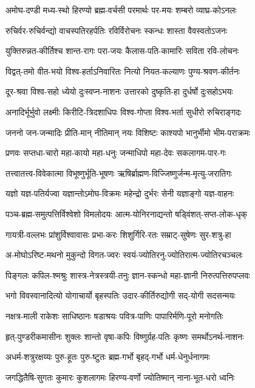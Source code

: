 \twolineshloka
{अमोघ-दण्डी मध्य-स्थो हिरण्यो ब्रह्म-वर्चसी}
{परमार्थः पर-मयः शम्बरो व्याघ्र-कोऽनलः}

\twolineshloka
{रुचिर्वर-रुचिर्वन्द्यो वाचस्पतिरहर्पतिः}
{रविर्विरोचनः स्कन्धः शास्ता वैवस्वतोऽजनः}

\twolineshloka
{युक्तिरुन्नत-कीर्तिश्च शान्त-रागः परा-जयः}
{कैलास-पति-कामारिः सविता रवि-लोचनः}

\twolineshloka
{विद्वत्-तमो वीत-भयो विश्व-हर्ताऽनिवारितः}
{नित्यो नियत-कल्याणः पुण्य-श्रवण-कीर्तनः}

\twolineshloka
{दूर-श्रवा विश्व-सहो ध्येयो दुःस्वप्न-नाशनः}
{उत्तारको दुष्कृति-हा दुर्धर्षो दुःसहोऽभयः}

\twolineshloka
{अनादिर्भूर्भुवो लक्ष्मीः किरीटि-त्रिदशाधिपः}
{विश्व-गोप्ता विश्व-भर्ता सुधीरो रुचिराङ्गदः}

\twolineshloka
{जननो जन-जन्मादिः प्रीति-मान् नीतिमान् नयः}
{विशिष्टः काश्यपो भानुर्भीमो भीम-पराक्रमः}

\twolineshloka
{प्रणवः सप्तधा-चारो महा-कायो महा-धनुः}
{जन्माधिपो महा-देवः सकलागम-पार-गः}

\twolineshloka
{तत्त्वातत्त्व-विवेकात्मा विभूष्णुर्भूति-भूषणः}
{ऋषिर्ब्राह्मण-विज्जिष्णुर्जन्म-मृत्यु-जरातिगः}

\twolineshloka
{यज्ञो यज्ञ-पतिर्यज्वा यज्ञान्तोऽमोघ-विक्रमः}
{महेन्द्रो दुर्भरः सेनी यज्ञाङ्गो यज्ञ-वाहनः}

\twolineshloka
{पञ्च-ब्रह्म-समुत्पत्तिर्विश्वेशो विमलोदयः}
{आत्म-योनिरनाद्यन्तो षड्विंशत्-सप्त-लोक-धृक्}

\twolineshloka
{गायत्री-वल्लभः प्रांशुर्विश्वावासः प्रभा-करः}
{शिशुर्गिरि-रतः सम्राट्-सुषेणः सुर-शत्रु-हा}

\twolineshloka
{अ-मोघोऽरिष्ट-मथनो मुकुन्दो विगत-ज्वरः}
{स्वयं-ज्योतिरनु-ज्योतिरात्म-ज्योतिरचञ्चलः}

\twolineshloka
{पिङ्गलः कपिल-श्मश्रुः शास्त्र-नेत्रस्त्रयी-तनुः}
{ज्ञान-स्कन्धो महा-ज्ञानी निरुत्पत्तिरुपप्लवः}

\twolineshloka
{भगो विवस्वानादित्यो योगाचार्यो बृहस्पतिः}
{उदार-कीर्तिरुद्योगी सद्-योगी सदसन्मयः}

\twolineshloka
{नक्षत्र-माली राकेशः साधिष्ठानः षडाश्रयः}
{पवित्र-पाणिः पापारिर्मणि-पूरो मनोगतिः}

\twolineshloka
{हृत्-पुण्डरीकमासीनः शुक्लः शान्तो वृषा-कपिः}
{विष्णुर्ग्रह-पतिः कृष्णः समर्थोऽनर्थ-नाशनः}

\twolineshloka
{अधर्म-शत्रुरक्षय्यः पुरु-हूतः पुरु-ष्टुतः}
{ब्रह्म-गर्भो बृहद्-गर्भो धर्म-धेनुर्धनागमः}

\twolineshloka
{जगद्धितैषि-सुगतः कुमारः कुशलागमः}
{हिरण्य-वर्णो ज्योतिष्मान् नाना-भूत-धरो ध्वनिः}

